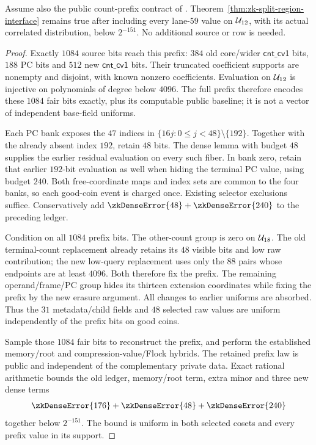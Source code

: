 \begin{theorem}\label{thm:zk-prefix-split-interface}
Assume also the public count-prefix contract of . Theorem~\ref{thm:zk-split-region-interface} remains true after including every lane-$59$ value on $\mathcal{U}_{12}$, with its actual correlated distribution, below $2^{-151}$. No additional source or row is needed.
\end{theorem}
\begin{proof}
Exactly $1084$ source bits reach this prefix: $384$ old core/wider $\mathsf{cnt\_cv1}$ bits, $188$ PC bits and $512$ new $\mathsf{cnt\_cv1}$ bits. Their truncated coefficient supports are nonempty and disjoint, with known nonzero coefficients. Evaluation on $\mathcal{U}_{12}$ is injective on polynomials of degree below $4096$. The full prefix therefore encodes these $1084$ fair bits exactly, plus its computable public baseline; it is not a vector of independent base-field uniforms.

Each PC bank exposes the $47$ indices in $\{16j:0\le j<48\}\setminus\{192\}$. Together with the already absent index $192$, retain $48$ bits. The dense lemma with budget $48$ supplies the earlier residual evaluation on every such fiber. In bank zero, retain that earlier $192$-bit evaluation as well when hiding the terminal PC value, using budget $240$. Both free-coordinate maps and index sets are common to the four banks, so each good-coin event is charged once. Existing selector exclusions suffice. Conservatively add $\zkDenseError{48}+\zkDenseError{240}$ to the preceding ledger.

Condition on all $1084$ prefix bits. The other-count group is zero on $\mathcal{U}_{18}$. The old terminal-count replacement already retains its $48$ visible bits and low raw contribution; the new low-query replacement uses only the $88$ pairs whose endpoints are at least $4096$. Both therefore fix the prefix. The remaining operand/frame/PC group hides its thirteen extension coordinates while fixing the prefix by the new erasure argument. All changes to earlier uniforms are absorbed. Thus the $31$ metadata/child fields and $48$ selected raw values are uniform independently of the prefix bits on good coins.

Sample those $1084$ fair bits to reconstruct the prefix, and perform the established memory/root and compression-value/Flock hybrids. The retained prefix law is public and independent of the complementary private data. Exact rational arithmetic bounds the old ledger, memory/root term, extra minor and three new dense terms
\[
 \zkDenseError{176}+\zkDenseError{48}+\zkDenseError{240}
\]
together below $2^{-151}$. The bound is uniform in both selected cosets and every prefix value in its support.
\end{proof}

